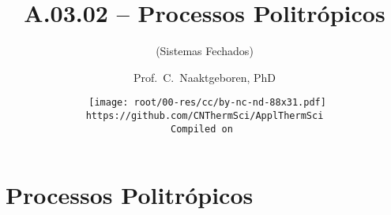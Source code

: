\makeatletter
\immediate{} %
\makeatother


\title{A.03.02 -- Processos Politrópicos}
\subtitle{(Sistemas Fechados)}
\author{Prof.~C.~Naaktgeboren, PhD}
\date{{\scriptsize\tt%
    \texttt{[image: root/00-res/cc/by-nc-nd-88x31.pdf]}\\[\smallskipamount]
    https://github.com/CNThermSci/ApplThermSci\\
    Compiled on 
}}

\logo{%
    \parbox{158mm}{%
        \texttt{[image: root/00-res/UTFPR/UTFPR-logo-A.pdf]}\hfill%
        \texttt{[image: root/00-res/logo/CNThermSci-logo-A.pdf]}%
}} %
\frame{\titlepage}

\frame{\tableofcontents}

\section{Processos Politrópicos}

